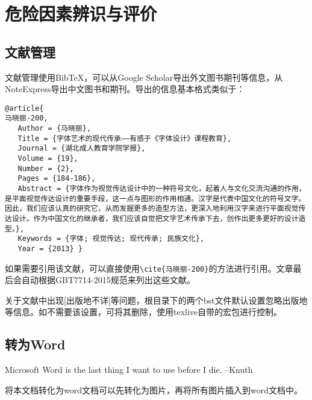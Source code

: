 \section{危险因素辨识与评价}
\subsection{文献管理}
文献管理使用Bib\TeX ，可以从Google Scholar导出外文图书期刊等信息，从NoteExpress导出中文图书和期刊\cite{刘运来-199}。导出的信息基本格式类似于：
\begin{verbatim}
@article{
马晓丽-200,
   Author = {马晓丽},
   Title = {字体艺术的现代传承——有感于《字体设计》课程教育},
   Journal = {湖北成人教育学院学报},
   Volume = {19},
   Number = {2},
   Pages = {184-186},
   Abstract = {字体作为视觉传达设计中的一种符号文化，起着人与文化交流沟通的作用，是平面视觉传达设计的重要手段，这一点与图形的作用相通。汉字是代表中国文化的符号文字。因此，我们应该认真的研究它，从而发掘更多的造型方法，更深入地利用汉字来进行平面视觉传达设计。作为中国文化的继承者，我们应该自觉把文字艺术传承下去，创作出更多更好的设计造型。},
   Keywords = {字体; 视觉传达; 现代传承; 民族文化},
   Year = {2013} }
\end{verbatim}
如果需要引用该文献，可以直接使用\verb|\cite{马晓丽-200}|的方法进行引用。文章最后会自动根据GBT7714-2015规范来列出这些文献。

关于文献中出现[出版地不详]等问题，根目录下的两个bst文件默认设置忽略出版地等信息。如不需要该设置，可将其删除，使用texlive自带的宏包进行控制。
\subsection{转为Word}
Microsoft Word is the last thing I want to use before I die.
--Knuth

将本文档转化为word文档可以先转化为图片，再将所有图片插入到word文档中。